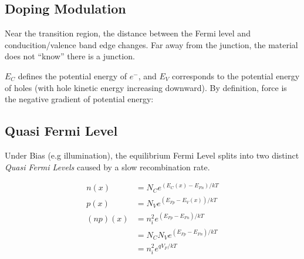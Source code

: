 \documentclass[a4paper, fontsize=8pt, landscape, DIV=1]{scrartcl}
\begin{document}
\begin{multicols*}{4}
\subsection{Doping Modulation}
Near the transition region, the distance between the Fermi level and conducition/valence band edge changes. Far away from the junction, the material does not ``know'' there is a junction.

$E_C$ defines the potential energy of $e^-$, and $E_V$ corresponds to the potential energy of holes (with hole kinetic energy increasing downward). By definition, force is the negative gradient of potential energy:


\subsection{Quasi Fermi Level}
Under Bias (e.g illumination), the equilibrium Fermi Level splits into two distinct \textit{Quasi Fermi Levels} caused by a slow recombination rate.

\begin{align*}
n(x) &= N_C e^{(E_C(x)-E_{Fn})/kT}\\
p(x) &= N_V e^{(E_{Fp}-E_V(x))/kT}\\
(np)(x) &= n_i^2 e^{(E_{Fp}-E_{Fn})/kT}\\
&= N_CN_V e^{(E_{Fp}-E_{Fn})/kT} \\
&= n_i^2 e^{qV_F/kT}
\end{align*}

\end{multicols*}
\setcounter{secnumdepth}{2}
\end{document}
